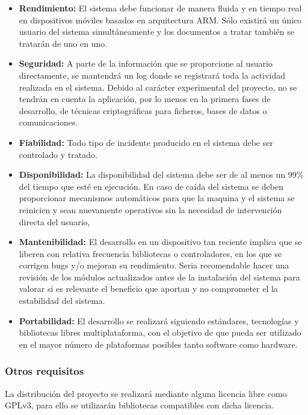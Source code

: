 \begin{itemize}
\item\textbf{Rendimiento:} El sistema debe funcionar de manera fluida y en tiempo real en dispositivos móviles basados en arquitectura ARM. Sólo existirá un único usuario del sistema simultáneamente y los documentos a tratar también se tratarán de uno en uno.

\item\textbf{Seguridad:} A parte de la información que se proporcione al usuario directamente, se mantendrá un log donde se registrará toda la actividad realizada en el sistema.
Debido al carácter experimental del proyecto, no se tendrán en cuenta la aplicación, por lo menos en la primera fases de desarrollo, de técnicas criptográficas para ficheros, bases de datos o comunicaciones.

\item\textbf{Fiabilidad:} Todo tipo de incidente producido en el sistema debe ser controlado y tratado. 

\item\textbf{Disponibilidad:} La disponibilidad del sistema debe ser de al menos un 99\% del tiempo que esté en ejecución. En caso de caída del sistema se deben proporcionar mecanismos automáticos para que la maquina y el sistema se reinicien y sean nuevamente operativos sin la necesidad de intervención directa del usuario,

\item\textbf{Mantenibilidad:} El desarrollo en un dispositivo tan reciente implica que se liberen con relativa frecuencia bibliotecas o controladores, en los que se corrigen bugs y/o mejoran su rendimiento. Seria recomendable hacer una revisión de los módulos actualizados antes de la instalación del sistema para valorar si es relevante el beneficio que aportan y no comprometer el la estabilidad del sistema.  

\item\textbf{Portabilidad:} El desarrollo se  realizará siguiendo estándares, tecnologías y bibliotecas libres multiplataforma, con el objetivo de que pueda ser utilizado en el mayor número de plataformas posibles tanto software como hardware.
\end{itemize}

\subsubsection{Otros requisitos}
La distribución del proyecto se realizará mediante alguna licencia libre como GPLv3, para ello se utilizarán bibliotecas compatibles con dicha licencia.

